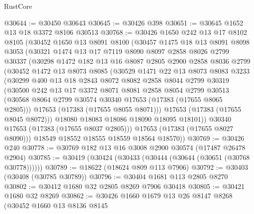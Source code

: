 \begin{lexlean}{RustCore}
\begin{coremodule}
@30644 := @30450 @30643
@30645 := @30426 @398
@30651 := @30645 @1652 @13 @18 @3372 @8106 @30513
@30768 := @30426
    @1650
    @242
    @13
    @17
    @8102
    @8105
    (@30452
      @1650
      @13
      @8091
      @8100
      (@30457
        @1475
        @18
        @13
        @8091
        @8098
        @3053
        (@30321
          @1474
          @13
          @17
          @7119
          @8090
          @8097
          @2858
          @8026
          @2799
          @30337
          (@30298
            @1472
            @182
            @13
            @16
            @8087
            @2805
            @2900
            @2858
            @8036
            @2799
            (@30452
              @1472
              @13
              @8073
              @8085
              (@30529
                @1471
                @22
                @13
                @8073
                @8083
                @3233
                (@30299
                  @400
                  @13
                  @18
                  @2843
                  @8072
                  @8082
                  @2858
                  @8044
                  @2799
                  @30319
                  (@30500
                    @242
                    @13
                    @17
                    @3372
                    @8071
                    @8081
                    @2858
                    @8054
                    @2799
                    @30513
                    (@30568 @8064 @2799 @30574 @30340 @17653 (@17383 (@17655 @8065 @2805)))
                    @17653
                    (@17383 (@17655 @8055 @8071)))
                  @17653
                  (@17383 (@17655 @8045 @8072)))
                @18080
                @18083
                @18086
                @18090
                @18095
                @18101))
            @30340
            @17653
            (@17383 (@17655 @8037 @2805)))
          @17653
          (@17383 (@17655 @8027 @8090)))
        @18549
        @18552
        @18555
        @18559
        @18564
        @18570))
@30769 := @30426 @240
@30778 := @30769 @182 @13 @16 @3008 @2900 @30574 (@17487 @26478 @2904)
@30785 := @30419 (@30424 (@30433 (@30444 (@30644 (@30651 (@30768 @30778))))))
@30789 := @18622 (@18624 @809 @113 @7906)
@30792 := @30403 (@30408 (@30785 @30789))
@30796 := @30404 @1681 @113 @2805 @8270
@30802 := @30412 @1680 @32 @2805 @8269 @7906 @30418
@30805 := @30421 @1680 @32 @8269
@30862 := @30426
    @1660
    @1679
    @13
    @26
    @8147
    @8268
    (@30452
      @1660
      @13
      @8136
      @8145

\end{coremodule}
\end{lexlean}
